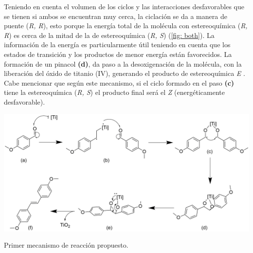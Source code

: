 \documentclass[fleqn,11pt]{SelfArx}
\begin{document}
\pagebreak

Teniendo en cuenta el volumen de los ciclos y las interacciones desfavorables que se tienen si ambos se encuentran muy cerca, la ciclaci\'on se da a manera de puente (\textit{R, R}), esto porque la energ\'ia total de la mol\'ecula con estereoqu\'imica (\textit{R, R}) es cerca de la mitad de la de estereoqu\'imica (\textit{R, S}) (\autoref{fig: both}). La informaci\'on de la energ\'ia es particularmente útil teniendo en cuenta que los estados de transici\'on y los productos de menor energ\'ia est\'an favorecidos. La formaci\'on de un pinacol \textbf{(d)}, da paso a la desoxigenaci\'on de la mol\'ecula, con la liberaci\'on del \'oxido de titanio (IV), generando el producto de estereoqu\'imica \textit{E} \cite{richards2001}. Cabe mencionar que seg\'un este mecanismo, si el ciclo formado en el paso \textbf{(c)} tiene la estereoqu\'imica (\textit{R, S}) el producto final ser\'a el \textit{Z} (energ\'eticamente desfavorable).
\begin{scheme}[h]
	\centering
	\includegraphics[width = \linewidth]{structures/mechanism.png}
	\caption{Primer mecanismo de reacci\'on propuesto.}
	\label{sch: primer}
\end{scheme}
\end{document}
